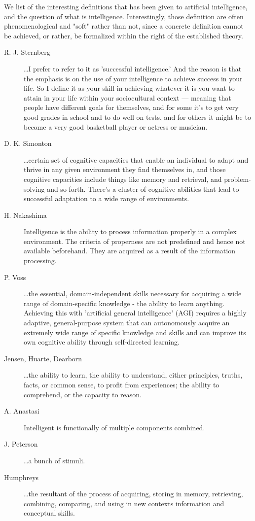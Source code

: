 We list of the interesting definitions that has been given to artificial intelligence, and the question of what is intelligence. Interestingly, those definition are often phenomenological and "soft" rather than not, since a concrete definition cannot be achieved, or rather, be formalized within the right of the established theory. 
\begin{description}
    \item[R. J. Sternberg] \dots I prefer to refer to it as 'successful intelligence.' And the reason is that the emphasis is on the use of your intelligence to achieve success in your life. So I define it as your skill in achieving whatever it is you want to attain in your life within your sociocultural context — meaning that people have different goals for themselves, and for some it's to get very good grades in school and to do well on tests, and for others it might be to become a very good basketball player or actress or musician. 
    \item[D. K. Simonton] \dots certain set of cognitive capacities that enable an individual to adapt and thrive in any given environment they find themselves in, and those cognitive capacities include things like memory and retrieval, and problem-solving and so forth. There's a cluster of cognitive abilities that lead to successful adaptation to a wide range of environments.
    \item[H. Nakashima] Intelligence is the ability to process information properly in a complex environment. The criteria of properness are not predefined and hence not available beforehand. They are acquired as a result of the information processing.
    \item[P. Voss] \dots the essential, domain-independent skills necessary for acquiring a wide range of domain-specific knowledge - the ability to learn anything. Achieving this with 'artificial general intelligence' (AGI) requires a highly adaptive, general-purpose system that can autonomously acquire an extremely wide range of specific knowledge and skills and can improve its own cognitive ability through self-directed learning. 
    \item[Jensen, Huarte, Dearborn] \dots the ability to learn, the ability to understand, either principles, truths, facts, or common sense, to profit from experiences; the ability to comprehend, or the capacity to reason.
    \item[A. Anastasi] Intelligent is functionally of multiple components combined.
    \item[J. Peterson] \dots a bunch of stimuli. 
    \item[Humphreys] \dots the resultant of the process of acquiring, storing in memory, retrieving, combining, comparing, and using in new contexts information and conceptual skills.
\end{description}


